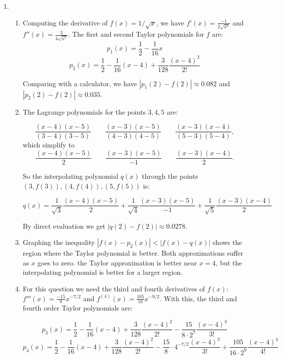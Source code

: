\begin{enumerate}
	\item \begin{enumerate}
		      \item Computing the derivative of $f(x) = 1/\sqrt{x}$, we have $f'(x) = \frac{-1}{2\sqrt{x^3}}$ and $f''(x) = \frac{3}{4\sqrt{x^5}}$.
		            The first and second Taylor polynomials for $f$ are:
		            \[p_1(x) = \frac{1}{2} -\frac{1}{16}x\]
		            \[p_2(x) = \frac{1}{2} -\frac{1}{16}(x-4) + \frac{3}{128}\frac{(x-4)^2}{2!}\]

		            Comparing with a calculator, we have $|p_1(2) - f(2)| \approx 0.082$ and $|p_2(2) - f(2)| \approx 0.035$.

		      \item The Lagrange polynomials for the points $3,4,5$ are:

		            \[
			            \frac{(x-4)(x-5)}{(3-4)(3-5)}\qquad \frac{(x-3)(x-5)}{(4-3)(4-5)}
			            \qquad \frac{(x-3)(x-4)}{(5-3)(5-4)},
		            \]
		            which simplify to
		            \[
			            \frac{(x-4)(x-5)}{2}\qquad \frac{(x-3)(x-5)}{-1}\qquad \frac{(x-3)(x-4)}{2}.
		            \]

		            So the interpolating polynomial $q(x)$ through the points $(3,f(3)),(4,f(4)),(5,f(5))$ is:

		            \[q(x) = \frac{1}{\sqrt{3}}\frac{(x-4)(x-5)}{2} + \frac{1}{\sqrt{4}}\frac{(x-3)(x-5)}{-1} + \frac{1}{\sqrt{5}}\frac{(x-3)(x-4)}{2}\]

		            By direct evaluation we get $|q(2)-f(2)| \approx 0.0278$.

		      \item Graphing the inequality $|f(x) - p_2(x)| < |f(x) - q(x)|$ shows the region where the Taylor polynomial is better. Both approximations suffer as $x$ goes to zero. the Taylor approximation is better near $x=4$, but the interpolating polynomial is better for a larger region.

		      \item For this question we need the third and fourth derivatives of $f(x)$: $f'''(x) = \frac{-15}{8}x^{-7/2}$ and $f^{(4)}(x) = \frac{105}{16}x^{-9/2}$. With this, the third and fourth order Taylor polynomials are:

                \[p_3(x) = \frac{1}{2} -\frac{1}{16}(x-4) + \frac{3}{128}\frac{(x-4)^2}{2!} -\frac{15}{8\cdot 2^7} \frac{(x-4)^3}{3!}\]
                \[p_4(x) = \frac{1}{2} -\frac{1}{16}(x-4) + \frac{3}{128}\frac{(x-4)^2}{2!} -\frac{15}{8}\cdot 4^{-7/2}\frac{(x-4)^3}{3!} + \frac{105}{16 \cdot 2^9}\frac{(x-4)^4}{4!}\]


\end{enumerate}
\end{enumerate}
